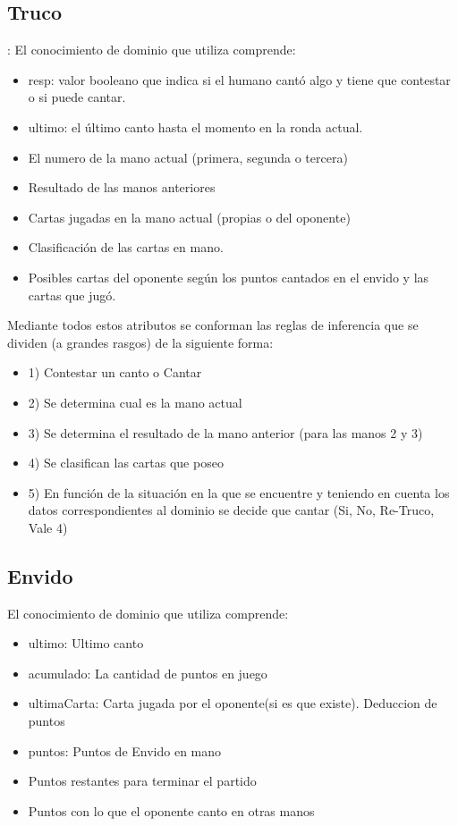 \documentclass[12pt,a4paper]{article}
\begin{document}
\subsection{Truco}:
El conocimiento de dominio que utiliza comprende:
\begin{itemize}
\item resp: valor booleano que indica si el humano cantó algo y tiene que contestar o si puede cantar.
\item ultimo: el último canto hasta el momento en la ronda actual.
\item El numero de la mano actual (primera, segunda o tercera)
\item Resultado de las manos anteriores
\item Cartas jugadas en la mano actual (propias o del oponente)
\item Clasificación de las cartas en mano.
\item Posibles cartas del oponente según los puntos cantados en el envido y las cartas que jugó.
\end{itemize}

Mediante todos estos atributos se conforman las reglas de inferencia que se dividen (a grandes rasgos) de la 
siguiente forma:

\begin{itemize}
\item 1) Contestar un canto o Cantar
\item 2) Se determina cual es la mano actual
\item 3) Se determina el resultado de la mano anterior (para las manos 2 y 3)
\item 4) Se clasifican las cartas que poseo
\item 5) En función de la situación en la que se encuentre y teniendo en cuenta los datos correspondientes al dominio
	   se decide que cantar (Si, No, Re-Truco, Vale 4)
\end{itemize}

\subsection{Envido}
El conocimiento de dominio que utiliza comprende:
\begin{itemize}
\item ultimo: Ultimo canto 
\item acumulado: La cantidad de puntos en juego
\item ultimaCarta: Carta jugada por el oponente(si es que existe). Deduccion de puntos
\item puntos: Puntos de Envido en mano
\item Puntos restantes para terminar el partido
\item Puntos con lo que el oponente canto en otras manos
\end{itemize}
\end{document}
